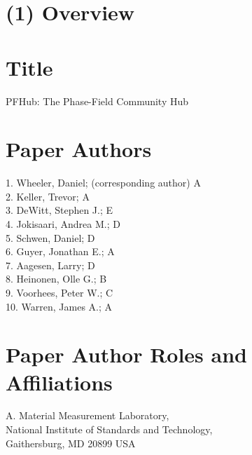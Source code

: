 \documentclass{jors}
\begin{document}
\newcommand\githublink[1]{\href{https://github.com/#1/}{\texttt{\textbf{@#1}}}}




\section*{(1) Overview}

\vspace{0.5cm}

\section*{Title}

PFHub: The Phase-Field Community Hub

\section*{Paper Authors}

1. Wheeler, Daniel; (corresponding author) A\\
2. Keller, Trevor; A\\
3. DeWitt, Stephen J.; E\\
4. Jokisaari, Andrea M.; D\\
5. Schwen, Daniel; D\\
6. Guyer, Jonathan E.; A\\
7. Aagesen, Larry; D\\
8. Heinonen, Olle G.; B\\
9. Voorhees, Peter W.; C\\
10. Warren, James A.; A

\section*{Paper Author Roles and Affiliations}

A. Material Measurement Laboratory, \\
National Institute of Standards and Technology,\\
Gaithersburg, MD 20899 USA
\end{document}
